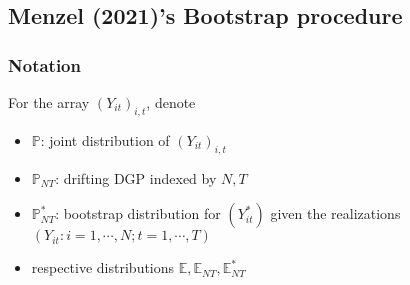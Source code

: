 \documentclass[twoside]{article}
\begin{document}
\subsection{Menzel (2021)'s Bootstrap procedure}
\subsubsection{Notation}
For the array $\left(Y_{it}\right)_{i,t}$, denote 
\begin{itemize}
    \item $\mathbb{P}$: joint distribution of $\left(Y_{it}\right)_{i,t}$
    \item $\mathbb{P}_{NT}$: drifting DGP indexed by $N,T$
    \item $\mathbb{P}^*_{NT}$: bootstrap distribution for $\left(Y^*_{it}\right)$ given the realizations $\left(  Y_{it}:i=1,\cdots,N; t= 1,\cdots,T  \right)$
    \item respective distributions $\mathbb{E},\mathbb{E}_{NT},\mathbb{E}^*_{NT}$
\end{itemize}
\end{document}
